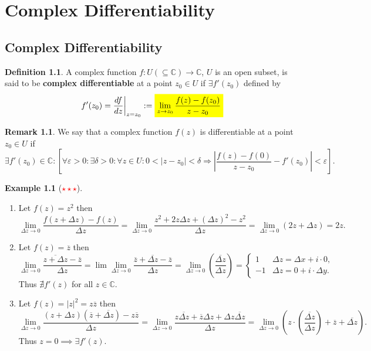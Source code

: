 \documentclass[12pt,openany]{book}
\newcommand{\mathcolorbox}[2]{\colorbox{#1}{$\displaystyle #2$}}
\theoremstyle{definition}
\newtheorem{definition}{Definition}[chapter]
\newtheorem{remark}{Remark}[section]
\newtheorem{example}{Example}[section]
\newcommand{\C}{\mathbb{C}}
\newcommand{\of}[1]{\left( #1 \right)}
\newcommand{\abs}[1]{\left\lvert #1 \right\rvert}
\newcommand{\conjugate}[1]{\overline{#1}}
\begin{document}
	\newpage
	\chapter{Complex Differentiability}
	
	\section{Complex Differentiability}
	\begin{tcolorbox}[colback=white,colframe=defcolor,arc=5pt,title={\color{white}\bf Complex Differentiability}]
		\begin{definition}
			A complex function $f:U(\subseteq\C)\to\C$, $U$ is an open subset, is said to be \textbf{complex differentiable} at a point $z_0\in U$ if $\exists f'(z_0)$ defined by\[
			f'(z_0)=\frac{df}{dz}\bigg|_{z=z_0}:=\mathcolorbox{-blue}{\lim_{z\to z_0}\frac{f(z)-f(z_0)}{z-z_0}}
			\]
		\end{definition}
	\end{tcolorbox}
	\begin{remark}
		We say that a complex function $f(z)$ is differentiable at a point $z_0\in U$ if \[
		\exists f'\of{z_0}\in\C:\left[\forall\varepsilon>0:\exists\delta>0:\forall z\in U:0<\abs{z-z_0}<\delta\Rightarrow\abs{\frac{f(z)-f(0)}{z-z_0}-f'(z_0)}<\varepsilon\right].
		\] 
	\end{remark}
	\vspace{8pt}
	\begin{example}[\textcolor{red}{$\star\star\star$}]
		\ \begin{enumerate}[(1)]
			\item Let $f\of{z}=z^2$ then \[
			\lim\limits_{\Delta z\to 0}\frac{f(z+\Delta z)-f(z)}{\Delta z}=\lim\limits_{\Delta z\to 0}\frac{z^2+2z\Delta z+(\Delta z)^2-z^2}{\Delta z}=\lim\limits_{\Delta z\to 0}(2z+\Delta z)=2z.
			\]
			\item Let $f\of{z}=\conjugate{z}$ then \[
			\lim\limits_{\Delta z\to 0}\frac{\conjugate{z+\Delta z}-\conjugate{z}}{\Delta z}=\lim\lim_{\Delta z\to 0}\frac{\conjugate{z}+\conjugate{\Delta z}-\conjugate{z}}{\Delta z}=\lim\limits_{\Delta z\to 0}\of{\frac{\conjugate{\Delta z}}{\Delta z}}=\begin{cases}
				1 &\Delta z=\Delta x+i\cdot 0,\\
				-1 &\Delta z= 0+i\cdot\Delta y.
			\end{cases}
			\] Thus $\nexists f'(z)$ for all $z\in\C$.
			\item Let $f\of{z}=\abs{z}^2=z\conjugate{z}$ then\[
			\lim\limits_{\Delta z\to 0}\frac{(z+\Delta z)(\conjugate{z}+\conjugate{\Delta z})-z\conjugate{z}}{\Delta z}=\lim\limits_{\Delta z\to 0}\frac{z\conjugate{\Delta z}+\conjugate{z}\Delta z+\Delta z\conjugate{\Delta z}}{\Delta z}=\lim\limits_{\Delta z\to 0}\of{z\cdot\of{\frac{\conjugate{\Delta z}}{\Delta z}}+\conjugate{z}+\conjugate{\Delta z}}.
			\] Thus $z=0\implies\exists f'(z)$.
		\end{enumerate}
	\end{example}
	
\end{document}
